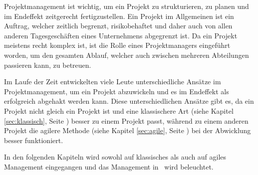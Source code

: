 
Projektmanagement ist wichtig, um ein Projekt zu strukturieren, zu planen und im Endeffekt zeitgerecht fertigzustellen. Ein Projekt im Allgemeinen ist ein Auftrag, welcher zeitlich begrenzt, risikobehaftet und daher auch von allen anderen Tagesgeschäften eines Unternehmens abgegrenzt ist. Da ein Projekt meistens recht komplex ist, ist die Rolle eines Projektmanagers eingeführt worden, um den gesamten Ablauf, welcher auch zwischen mehreren Abteilungen passieren kann, zu betreuen. \cite{Projectman.}

Im Laufe der Zeit entwickelten viele Leute unterschiedliche Ansätze im Projektmanagement, um ein Projekt abzuwickeln und es im Endeffekt als erfolgreich abgehakt werden kann. Diese unterschiedlichen Ansätze gibt es, da ein Projekt nicht gleich ein Projekt ist und eine klassischere Art (siehe Kapitel \ref{sec:klassisch}, Seite \pageref{sec:klassisch}) besser zu einem Projekt passt, während zu einem anderen Projekt die agilere Methode (siehe Kapitel \ref{sec:agile}, Seite \pageref{sec:agile}) bei der Abwicklung besser funktioniert. \cite{Projectman.}

In den folgenden Kapiteln wird sowohl auf klassisches als auch auf agiles Management eingegangen und das Management in \ZELIA\ wird beleuchtet. \cite{Projectman.}


